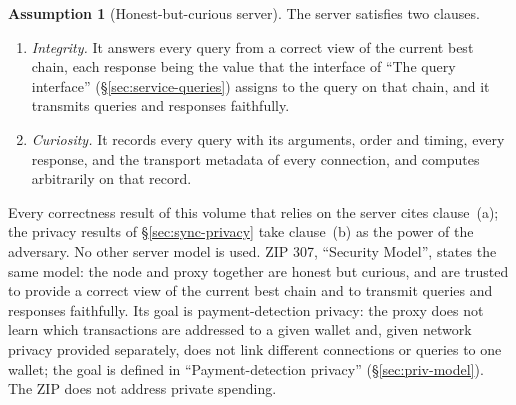 \documentclass[11pt,a4paper]{article}
\theoremstyle{definition}
\newtheorem{assumption}[theorem]{Assumption}
\begin{document}
\begin{assumption}[Honest-but-curious server]\label{ass:service-hbc}
The server satisfies two clauses.
\begin{enumerate}[label=(\alph*)]
\item \emph{Integrity.} It answers every query from a correct view of the
  current best chain, each response being the value that the interface of
  ``The query interface'' (\S\ref{sec:service-queries}) assigns to the query
  on that chain, and it transmits queries and responses faithfully.
\item \emph{Curiosity.} It records every query with its arguments, order and
  timing, every response, and the transport metadata of every connection,
  and computes arbitrarily on that record.
\end{enumerate}
\end{assumption}

Every correctness result of this volume that relies on the server cites
clause~(a); the privacy results of \S\ref{sec:sync-privacy} take clause~(b) as
the power of the adversary. No other server model is used. ZIP 307, ``Security
Model'', states the same model: the node and proxy together are honest but
curious, and are trusted to provide a correct view of the current best chain
and to transmit queries and responses faithfully. Its goal is payment-detection
privacy: the proxy does not learn which transactions are addressed to a given
wallet and, given network privacy provided separately, does not link different
connections or queries to one wallet; the goal is defined in
``Payment-detection privacy'' (\S\ref{sec:priv-model}). The ZIP does not
address private spending.
\end{document}
